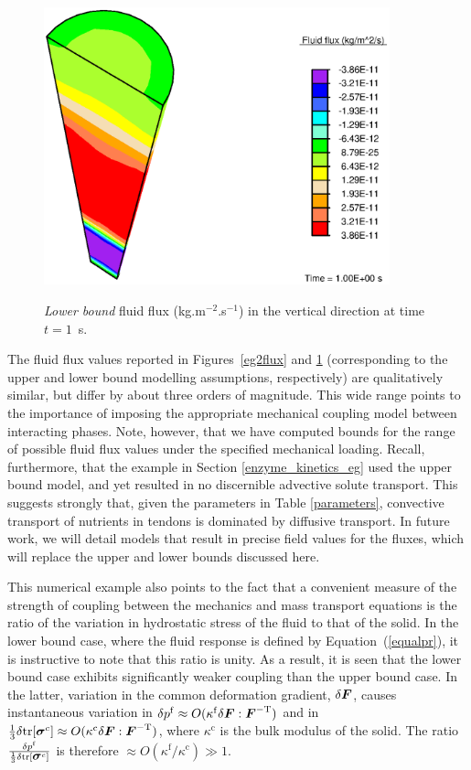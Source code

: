\begin{figure}[ht]
  \centering
      {\includegraphics[width=10.00cm]{images/lower-bound-flux.eps}}
      \caption{{\em Lower bound} fluid flux (kg.m$^{-2}$.s$^{-1}$) in
        the vertical direction at time $t=1$~s.}
      \label{lowerbound}
\end{figure}

The fluid flux values reported in Figures~\ref{eg2flux} and
\ref{lowerbound} (corresponding to the upper and lower bound modelling
assumptions, respectively) are qualitatively similar, but differ by
about three orders of magnitude. This wide range points to the
importance of imposing the appropriate mechanical coupling model
between interacting phases. Note, however, that we have computed
bounds for the 
range of possible fluid flux values under the specified mechanical
loading. Recall, furthermore, that the example in Section
\ref{enzyme_kinetics_eg} used the upper bound model, and yet resulted
in no discernible advective solute transport. This suggests strongly
that, given the parameters in Table \ref{parameters}, convective
transport of nutrients in tendons is dominated by diffusive
transport. In future work, we will detail models that result in precise
field values for the fluxes, which will replace the upper and lower
bounds discussed here.  


This numerical example also points to the fact that a convenient
measure of the strength of 
coupling between the mechanics and mass transport equations is the
ratio of the variation in hydrostatic stress of the fluid to that of
the solid. In the lower bound case, where the fluid response is
defined by Equation~(\ref{equalpr}), it is instructive to note that
this ratio is unity. As a result, it is seen that the lower bound case
exhibits significantly weaker coupling than the upper bound case. In
the latter, variation in the common deformation gradient, $\delta
\mbox{\boldmath$ F$}$, causes instantaneous variation in \mbox{$\delta p^{\mathrm{f}} \approx
  O(\kappa^{\mathrm{f}} \delta \mbox{\boldmath$ F$}:\mbox{\boldmath$ F$}^{-\mathrm{T}})$} and in
\mbox{$\frac{1}{3} \delta\mathrm{\small{tr}}[\mbox{\boldmath$\sigma$}^{c}] \approx
  O(\kappa^{\mathrm{c}} \delta \mbox{\boldmath$ F$}:\mbox{\boldmath$ F$}^{-\mathrm{T}})$}, where
$\kappa^{\mathrm{c}}$ is the bulk modulus of the solid. The ratio
$\frac{\delta p^{\mathrm{f}}}{\frac{1}{3} \delta
  \mathrm{\small{tr}}[\mbox{\boldmath$\sigma$}^{c}]}$ is therefore \mbox{$\approx
O(\kappa^{\mathrm{f}}/\kappa^{\mathrm{c}}) \gg 1$}.

